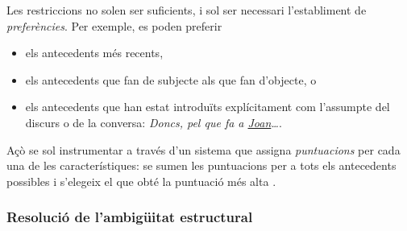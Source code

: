 Les restriccions no solen ser suficients, i sol ser necessari
l'establiment de \emph{preferències}. Per exemple, es poden preferir
\begin{itemize}
\item els antecedents més recents,
\item els antecedents que fan de subjecte als que fan d'objecte, o
\item els antecedents que han estat introduïts explícitament com
  l'assumpte del discurs o de la conversa: \emph{Doncs, pel que fa a
    \underline{Joan}\ldots}.
\end{itemize}
Açò se sol instrumentar a través d'un sistema que assigna
\emph{puntuacions} per cada una de les característiques: se sumen les
puntuacions per a tots els antecedents possibles i s'elegeix el que
obté la puntuació més alta \citep{lappin94j}.

\subsubsection{Resolució de l'ambigüitat estructural}
\label{s3:resambest}

